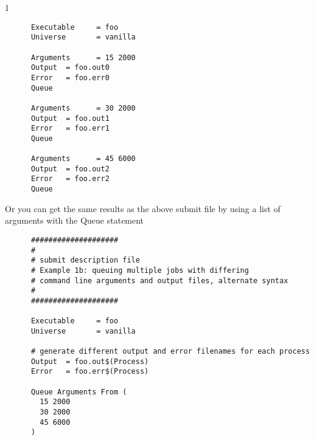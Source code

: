 \begin{ManPage}{\label{man-condor-submit}}{1}
\begin{itemize}
\begin{verbatim}
      Executable     = foo                                                   
      Universe       = vanilla
                                                                         
      Arguments      = 15 2000                                               
      Output  = foo.out0                                                     
      Error   = foo.err0
      Queue                                                                  
                                                                         
      Arguments      = 30 2000                                               
      Output  = foo.out1                                                     
      Error   = foo.err1
      Queue                                                                  
                                                                         
      Arguments      = 45 6000                                               
      Output  = foo.out2                                                     
      Error   = foo.err2
      Queue                   
\end{verbatim}
\normalsize

Or you can get the same results as the above submit file by using a list of arguments with the Queue statement

\footnotesize
\begin{verbatim}
      ####################
      #
      # submit description file
      # Example 1b: queuing multiple jobs with differing
      # command line arguments and output files, alternate syntax
      #                                                                      
      ####################                                                   

      Executable     = foo
      Universe       = vanilla

      # generate different output and error filenames for each process
      Output  = foo.out$(Process)
      Error   = foo.err$(Process)

      Queue Arguments From (
        15 2000
        30 2000
        45 6000
      )

\end{verbatim}
\normalsize


\end{itemize}
\end{ManPage}
